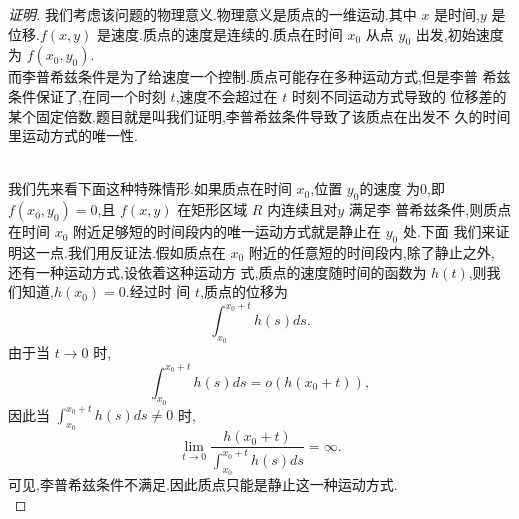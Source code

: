 \documentclass[a4paper, 12pt]{article} %
\begin{document}
\begin{CJK}{UTF8}{gkai}
\begin{proof}[证明]
我们考虑该问题的物理意义.物理意义是质点的一维运动.其中 $x$ 是时间,$y$
  是位移.$f(x,y)$ 是速度.质点的速度是连续的.质点在时间 $x_0$ 从点 $y_0$ 出发,初始速度为 $f(x_0,y_0)$.\\

  而李普希兹条件是为了给速度一个控制.质点可能存在多种运动方式,但是李普
  希兹条件保证了,在同一个时刻 $t$,速度不会超过在 $t$ 时刻不同运动方式导致的
  位移差的某个固定倍数.题目就是叫我们证明,李普希兹条件导致了该质点在出发不
  久的时间里运动方式的唯一性.\\\\
\begin{comment}
  我们先来探索一些情形.如果质点速度连续.在时间 $x_0$ 的时候位于位
  置 $y_0$,且此时的速度为$f(x_0,y_0)$,且之后质点受到变力 $F(t)$ 的作用,我
  们知道,经历时间 $t$ 后,质点的速度为
$$
\int_{0}^{t}\frac{F(s)}{m}+f(x_0,y_{0})ds.
$$
其中 $m$ 是质点的质量.因此,经历时间 $t$ 后,质点的位移为
$$
\int_{0}^{t}\left(\int_0^r \frac{F(s)}{m}ds+f(x_0,y_0)r\right)dr.
$$
同理,如果质点受到的力的作用是 $G(t)$,则经过时间 $t$ 后,质点的位移为
$$
\int_{0}^{t}\left(\int_0^r \frac{G(s)}{m}ds+f(x_0,y_0)r\right)dr.
$$
因此两种运动方式在经过时间 $t$ 后导致的位移差为
\begin{align*}
  &\int_{0}^{t}\left(\int_0^r
    \frac{F(s)}{m}ds+f(x_0,y_0)r\right)dr-\int_{0}^{t}\left(\int_0^r
    \frac{G(s)}{m}ds+f(x_0,y_0)r\right)dr\\&=\int_0^t\left(\int_0^{r}\frac{F(s)-G(s)}{m}ds\right)dr.
\end{align*}
如果 $F(t)$ 是恒力 $Q_1$,$G(t)$ 是和 $F(t)$ 不相等的另一个恒力 $Q_2$,下
面我们来看
$$
\frac{\int_0^{t}\frac{F(s)-G(s)}{m}ds}{\int_0^t\left(\int_0^{r}\frac{F(s)-G(s)}{m}ds\right)dr}
$$
上式化简为
$$
\frac{\frac{t}{m}(Q_1-Q_2)}{\frac{1}{2}\frac{t^{2}}{m}(Q_1-Q_2)}
$$
此时,当 $t\to 0$ 时,显然不满足李普希兹条件.\\
\end{comment}
我们先来看下面这种特殊情形.如果质点在时间 $x_0$,位置 $y_0$的速度
为0,即 $f(x_0,y_0)=0$,且 $f(x,y)$ 在矩形区域 $R$ 内连续且对$y$ 满足李
普希兹条件,则质点在时间 $x_0$ 附近足够短的时间段内的唯一运动方式就是静止在 $y_0$ 处.下面
我们来证明这一点.我们用反证法.假如质点在 $x_0$ 附近的任意短的时间段内,除了静止之外,
还有一种运动方式,设依着这种运动方
式,质点的速度随时间的函数为 $h(t)$,则我们知道,$h(x_0)=0$.经过时
间 $t$,质点的位移为
$$
\int_{x_{0}}^{x_0+t}h(s)ds.
$$
由于当 $t\to 0$ 时,
$$
\int_{x_0}^{x_0+t}h(s)ds=o(h(x_0+t)),
$$
因此当 $\int_{x_0}^{x_0+t}h(s)ds\neq 0$ 时,
$$
\lim_{t\to 0}\frac{h(x_0+t)}{\int_{x_{0}}^{x_0+t}h(s)ds}=\infty.
$$
可见,李普希兹条件不满足.因此质点只能是静止这一种运动方式.\\


\end{proof}
\end{CJK}
\end{document}
